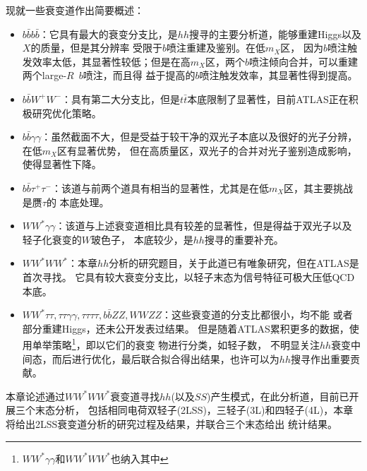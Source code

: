 现就一些衰变道作出简要概述：
\begin{itemize}
 \item $b\bar{b}b\bar{b}$：它具有最大的衰变分支比，是$hh$搜寻的主要分析道，能够重建Higgs以及$X$的质量，但是其分辨率
受限于$b$喷注重建及鉴别。在低$m_X$区，
 因为$b$喷注触发效率太低，其显著性较低；但是在高$m_X$区，两个$b$喷注倾向合并，可以重建两个large-$R$~$b$喷注，而且得
益于提高的$b$喷注触发效率，其显著性得到提高。
 \item $b\bar{b}W^{+}W^{-}$：具有第二大分支比，但是$t\bar{t}$本底限制了显著性，目前ATLAS正在积极研究优化策略。
 \item $b\bar{b}\gamma\gamma$：虽然截面不大，但是受益于较干净的双光子本底以及很好的光子分辨，
在低$m_X$区有显著优势，
 但在高质量区，双光子的合并对光子鉴别造成影响，使得显著性下降。
 \item $b\bar{b}\tau^{+}\tau^{-}$：该道与前两个道具有相当的显著性，尤其是在低$m_X$区，其主要挑战是赝$\tau$的
本底处理。
 \item $WW^{*}\gamma\gamma$：该道与上述衰变道相比具有较差的显著性，但是得益于双光子以及轻子化衰变的$W$玻色子，
本底较少，是$hh$搜寻的重要补充。
 \item $WW^{*}WW^{*}$：本章$hh$分析的研究题目，关于此道已有唯象研究\cite{4WTheory}，但在ATLAS是首次寻找。
它具有较大衰变分支比，以轻子末态为信号特征可极大压低QCD本底。
 \item $WW^{*}\tau\tau, \tau\tau\gamma\gamma, \tau\tau\tau\tau, b\bar{b}ZZ, WWZZ$：这些衰变道的分支比都很小，均不能
或者部分重建Higgs，还未公开发表过结果。
 但是随着ATLAS累积更多的数据，使用单举策略\footnote{$WW^{*}\gamma\gamma$和$WW^{*}WW^{*}$也纳入其中}，即以它们的衰变
物进行分类，如轻子数，
 不明显关注$hh$衰变中间态，而后进行优化，最后联合拟合得出结果，也许可以为$hh$搜寻作出重要贡献。
\end{itemize}

本章论述通过$WW^{*}WW^{*}$衰变道寻找$hh$(以及$SS$)产生模式，在此分析道，目前已开展三个末态分析，
包括相同电荷双轻子(2LSS)，三轻子(3L)和四轻子(4L)，本章将给出2LSS衰变道分析的研究过程及结果，并联合三个末态给出
统计结果。
